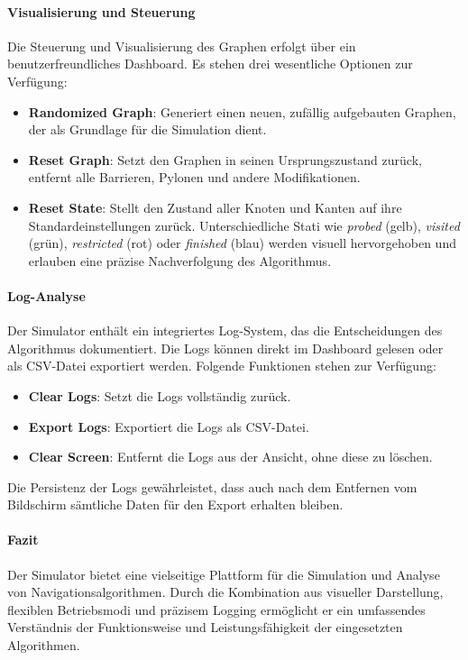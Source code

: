 \documentclass[main.tex]{subfiles} %
\begin{document}
\paragraph{Visualisierung und Steuerung}

Die Steuerung und Visualisierung des Graphen erfolgt über ein benutzerfreundliches Dashboard. Es stehen drei wesentliche Optionen zur Verfügung:

\begin{itemize}
    \item \textbf{Randomized Graph}:  
    Generiert einen neuen, zufällig aufgebauten Graphen, der als Grundlage für die Simulation dient.

    \item \textbf{Reset Graph}:  
    Setzt den Graphen in seinen Ursprungszustand zurück, entfernt alle Barrieren, Pylonen und andere Modifikationen.

    \item \textbf{Reset State}:  
    Stellt den Zustand aller Knoten und Kanten auf ihre Standardeinstellungen zurück. Unterschiedliche Stati wie \emph{probed} (gelb), \emph{visited} (grün), \emph{restricted} (rot) oder \emph{finished} (blau) werden visuell hervorgehoben und erlauben eine präzise Nachverfolgung des Algorithmus.
\end{itemize}

\paragraph{Log-Analyse}

Der Simulator enthält ein integriertes Log-System, das die Entscheidungen des Algorithmus dokumentiert. Die Logs können direkt im Dashboard gelesen oder als CSV-Datei exportiert werden. Folgende Funktionen stehen zur Verfügung:

\begin{itemize}
    \item \textbf{Clear Logs}:  
    Setzt die Logs vollständig zurück.

    \item \textbf{Export Logs}:  
    Exportiert die Logs als CSV-Datei.

    \item \textbf{Clear Screen}:  
    Entfernt die Logs aus der Ansicht, ohne diese zu löschen.
\end{itemize}

Die Persistenz der Logs gewährleistet, dass auch nach dem Entfernen vom Bildschirm sämtliche Daten für den Export erhalten bleiben.

\paragraph{Fazit}

Der Simulator bietet eine vielseitige Plattform für die Simulation und Analyse von Navigationsalgorithmen. Durch die Kombination aus visueller Darstellung, flexiblen Betriebsmodi und präzisem Logging ermöglicht er ein umfassendes Verständnis der Funktionsweise und Leistungsfähigkeit der eingesetzten Algorithmen.
\end{document}
